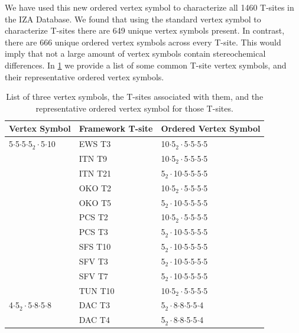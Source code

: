 \documentclass[preprint,numrefs,noinfo,sort&compress]{elsarticle}
\begin{document}
We have used this new ordered vertex symbol to characterize all 1460 T-sites in the IZA Database. We found that using the standard vertex symbol to characterize T-sites there are 649 unique vertex symbols present. In contrast, there are 666 unique ordered vertex symbols across every T-site. This would imply that not a large amount of vertex symbols contain stereochemical differences. In \cref{tab:ov} we provide a list of some common T-site vertex symbols, and their representative ordered vertex symbols. 

\begin{table}
\centering
\begin{threeparttable}
\caption{List of three vertex symbols, the T-sites associated with them, and the representative ordered vertex symbol for those T-sites. \label{tab:ov}}
{\scriptsize
\begin{tabular}{lll}
\hline
Vertex Symbol & Framework T-site & Ordered Vertex Symbol\\
\hline
5\(\cdot\)5\(\cdot\)5\(\cdot\)5\(_{\text{2}} \cdot\)5\(\cdot\)10 & EWS T3 & 10\(\cdot\)5\(_{\text{2}} \cdot\)5\(\cdot\)5\(\cdot\)5\(\cdot\)5\\
 & ITN T9 & 10\(\cdot\)5\(_{\text{2}} \cdot\)5\(\cdot\)5\(\cdot\)5\(\cdot\)5\\
 & ITN T21 & 5\(_{\text{2}} \cdot\)10\(\cdot\)5\(\cdot\)5\(\cdot\)5\(\cdot\)5\\
 & OKO T2 & 10\(\cdot\)5\(_{\text{2}} \cdot\)5\(\cdot\)5\(\cdot\)5\(\cdot\)5\\
 & OKO T5 & 5\(_{\text{2}} \cdot\)10\(\cdot\)5\(\cdot\)5\(\cdot\)5\(\cdot\)5\\
 & PCS T2 & 10\(\cdot\)5\(_{\text{2}} \cdot\)5\(\cdot\)5\(\cdot\)5\(\cdot\)5\\
 & PCS T3 & 5\(_{\text{2}} \cdot\)10\(\cdot\)5\(\cdot\)5\(\cdot\)5\(\cdot\)5\\
 & SFS T10 & 5\(_{\text{2}} \cdot\)10\(\cdot\)5\(\cdot\)5\(\cdot\)5\(\cdot\)5\\
 & SFV T3 & 5\(_{\text{2}} \cdot\)10\(\cdot\)5\(\cdot\)5\(\cdot\)5\(\cdot\)5\\
 & SFV T7 & 5\(_{\text{2}} \cdot\)10\(\cdot\)5\(\cdot\)5\(\cdot\)5\(\cdot\)5\\
 & TUN T10 & 10\(\cdot\)5\(_{\text{2}} \cdot\)5\(\cdot\)5\(\cdot\)5\(\cdot\)5\\
\hline
4\(\cdot\)5\(_{\text{2}} \cdot\)5\(\cdot\)8\(\cdot\)5\(\cdot\)8 & DAC T3 & 5\(_{\text{2}} \cdot\)8\(\cdot\)8\(\cdot\)5\(\cdot\)5\(\cdot\)4\\
 & DAC T4 & 5\(_{\text{2}} \cdot\)8\(\cdot\)8\(\cdot\)5\(\cdot\)5\(\cdot\)4\\

\end{tabular}}
\end{threeparttable}
\end{table}
\end{document}
